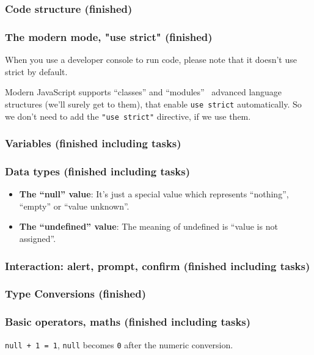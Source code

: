 \documentclass[a4paper, 12pt]{article}
\begin{document}
\subsubsection{Code structure (finished)}
\subsubsection{The modern mode, "use strict" (finished)}
When you use a developer console to run code, please note that it doesn't use strict by default.

Modern JavaScript supports “classes” and “modules” \textemdash\ advanced language structures (we'll surely get to them), that enable \verb|use strict| automatically. So we don't need to add the \verb|"use strict"| directive, if we use them.

\subsubsection{Variables (finished including tasks)}

\subsubsection{Data types (finished including tasks)}
\begin{itemize}
\item \textbf{The “null” value}: It's just a special value which represents “nothing”, “empty” or “value unknown”.

\item \textbf{The “undefined” value}: The meaning of undefined is “value is not assigned”.

\end{itemize}

\subsubsection{Interaction: alert, prompt, confirm (finished including tasks)}
\subsubsection{Type Conversions (finished)}
\subsubsection{Basic operators, maths (finished including tasks)}
\verb|null + 1 = 1|, \verb|null| becomes \verb|0| after the numeric conversion.
\end{document}
